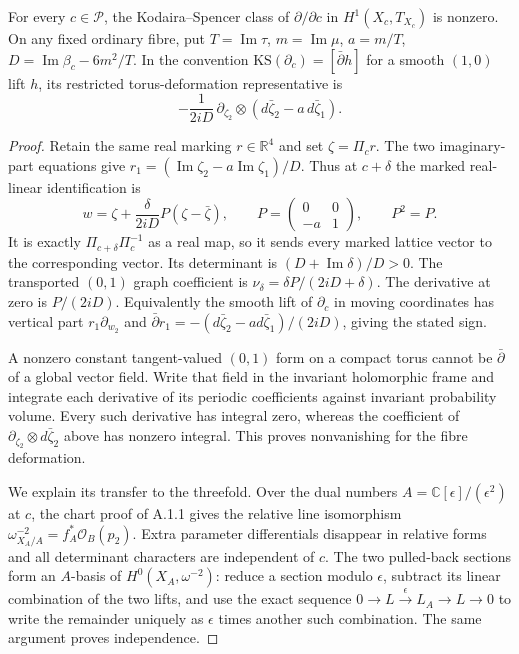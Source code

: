 \begin{proposition}[A.4.2; Proved]\label{st:A.4.2}
For every $c\in\mathcal P$, the Kodaira--Spencer class of $\partial/\partial c$ in $H^1(X_c,T_{X_c})$ is nonzero. On any fixed ordinary fibre, put $T=\operatorname{Im}\tau$, $m=\operatorname{Im}\mu$, $a=m/T$, $D=\operatorname{Im}\beta_c-6m^2/T$. In the convention $\mathrm{KS}(\partial_c)=[\bar\partial h]$ for a smooth $(1,0)$ lift $h$, its restricted torus-deformation representative is
\[
 -\frac{1}{2iD}\,\partial_{\zeta_2}\otimes
       (d\bar\zeta_2-a\,d\bar\zeta_1).
\]
\end{proposition}
\begin{proof}
Retain the same real marking $r\in\mathbb R^4$ and set $\zeta=\Pi_cr$. The two imaginary-part equations give
$r_1=(\operatorname{Im}\zeta_2-a\operatorname{Im}\zeta_1)/D$. Thus at $c+\delta$ the marked real-linear identification is
\[
 w=\zeta+\frac{\delta}{2iD}P(\zeta-\bar\zeta),\qquad
 P=\begin{pmatrix}0&0\\-a&1\end{pmatrix},\qquad P^2=P.
\]
It is exactly $\Pi_{c+\delta}\Pi_c^{-1}$ as a real map, so it sends every marked lattice vector to the corresponding vector. Its determinant is $(D+\operatorname{Im}\delta)/D>0$. The transported $(0,1)$ graph coefficient is $\nu_\delta=\delta P/(2iD+\delta)$. The derivative at zero is $P/(2iD)$. Equivalently the smooth lift of $\partial_c$ in moving coordinates has vertical part $r_1\partial_{w_2}$ and $\bar\partial r_1=-(d\bar\zeta_2-a d\bar\zeta_1)/(2iD)$, giving the stated sign.

A nonzero constant tangent-valued $(0,1)$ form on a compact torus cannot be $\bar\partial$ of a global vector field. Write that field in the invariant holomorphic frame and integrate each derivative of its periodic coefficients against invariant probability volume. Every such derivative has integral zero, whereas the coefficient of $\partial_{\zeta_2}\otimes d\bar\zeta_2$ above has nonzero integral. This proves nonvanishing for the fibre deformation.

We explain its transfer to the threefold. Over the dual numbers $A=\mathbb C[\epsilon]/(\epsilon^2)$ at $c$, the chart proof of A.1.1 gives the relative line isomorphism $\omega^{-2}_{X_A/A}=f_A^*\mathcal O_B(p_2)$. Extra parameter differentials disappear in relative forms and all determinant characters are independent of $c$. The two pulled-back sections form an $A$-basis of $H^0(X_A,\omega^{-2})$: reduce a section modulo $\epsilon$, subtract its linear combination of the two lifts, and use the exact sequence $0\to L\xrightarrow{\epsilon}L_A\to L\to0$ to write the remainder uniquely as $\epsilon$ times another such combination. The same argument proves independence.


\end{proof}
